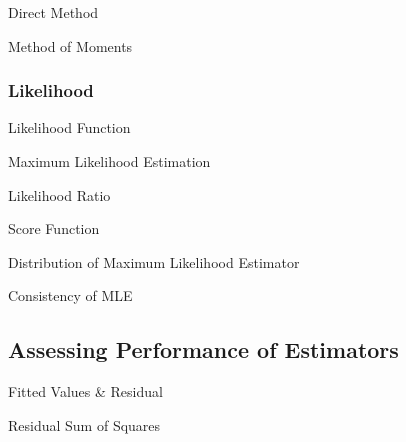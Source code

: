 \documentclass[11pt,a4paper]{article}
\begin{document}
\begin{definition}{Direct Method}
\end{definition}

\begin{definition}{Method of Moments}

\end{definition}

\subsubsection{Likelihood}

\begin{definition}{Likelihood Function}
\end{definition}

\begin{definition}{Maximum Likelihood Estimation}
\end{definition}

\begin{definition}{Likelihood Ratio}
\end{definition}

\begin{definition}{Score Function}

\end{definition}

\begin{theorem}{Distribution of Maximum Likelihood Estimator}

\end{theorem}

\begin{remark}{Consistency of MLE}

\end{remark}

\subsection{Assessing Performance of Estimators}

\begin{definition}{Fitted Values & Residual}

\end{definition}

\begin{definition}{Residual Sum of Squares}

\end{definition}
\end{document}
